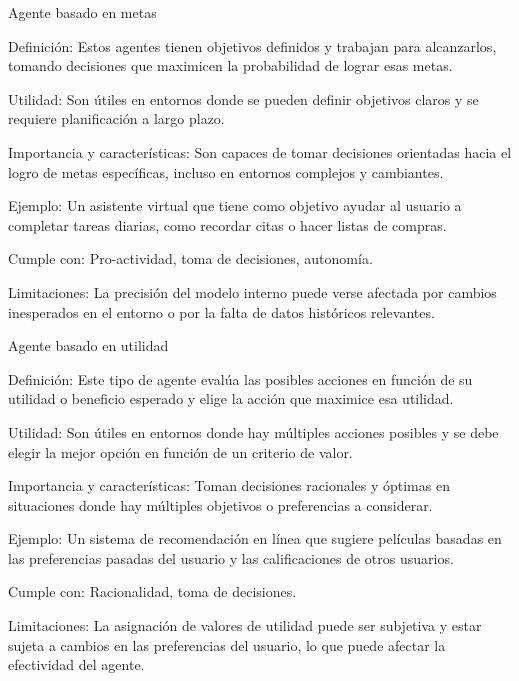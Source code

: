 \begin{myitemize}
    \item Agente basado en metas    
    \begin{myitemize}
        \item Definición: Estos agentes tienen objetivos definidos y trabajan para alcanzarlos, tomando decisiones que maximicen la probabilidad de lograr esas metas.
        \item Utilidad: Son útiles en entornos donde se pueden definir objetivos claros y se requiere planificación a largo plazo.
        \item Importancia y características: Son capaces de tomar decisiones orientadas hacia el logro de metas específicas, incluso en entornos complejos y cambiantes.
        \item Ejemplo: Un asistente virtual que tiene como objetivo ayudar al usuario a completar tareas diarias, como recordar citas o hacer listas de compras.
        \item Cumple con: Pro-actividad, toma de decisiones, autonomía.
        \item Limitaciones: La precisión del modelo interno puede verse afectada por cambios inesperados en el entorno o por la falta de datos históricos relevantes.
    \end{myitemize}
    
    \item Agente basado en utilidad    
    \begin{myitemize}
        \item Definición: Este tipo de agente evalúa las posibles acciones en función de su utilidad o beneficio esperado y elige la acción que maximice esa utilidad.
        \item Utilidad: Son útiles en entornos donde hay múltiples acciones posibles y se debe elegir la mejor opción en función de un criterio de valor.
        \item Importancia y características: Toman decisiones racionales y óptimas en situaciones donde hay múltiples objetivos o preferencias a considerar.
        \item Ejemplo: Un sistema de recomendación en línea que sugiere películas basadas en las preferencias pasadas del usuario y las calificaciones de otros usuarios.
        \item Cumple con: Racionalidad, toma de decisiones.
        \item Limitaciones: La asignación de valores de utilidad puede ser subjetiva y estar sujeta a cambios en las preferencias del usuario, lo que puede afectar la efectividad del agente.
    \end{myitemize}


\end{myitemize}
